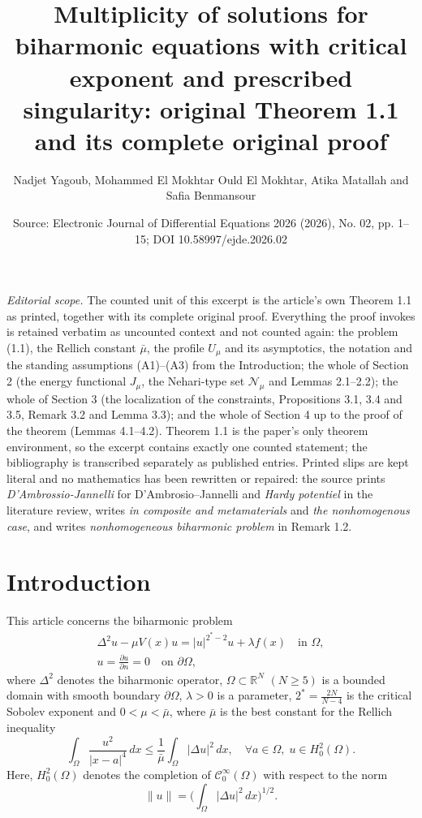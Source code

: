\documentclass[10pt,a4paper]{amsart}
\title[Singular critical biharmonic problem: original Theorem 1.1]{Multiplicity of solutions for biharmonic equations with critical exponent and prescribed singularity: original Theorem 1.1 and its complete original proof}
\author{Nadjet Yagoub, Mohammed El Mokhtar Ould El Mokhtar, Atika Matallah and Safia Benmansour}
\date{Source: Electronic Journal of Differential Equations 2026 (2026), No. 02, pp. 1--15; DOI 10.58997/ejde.2026.02}
\numberwithin{equation}{section}
\begin{document}
\maketitle
\noindent\textit{Editorial scope.} The counted unit of this excerpt is the article's own Theorem 1.1 as printed, together with its complete original proof. Everything the proof invokes is retained verbatim as uncounted context and not counted again: the problem (1.1), the Rellich constant $\bar\mu$, the profile $U_\mu$ and its asymptotics, the notation and the standing assumptions (A1)--(A3) from the Introduction; the whole of Section 2 (the energy functional $J_\mu$, the Nehari-type set $\mathcal{N}_\mu$ and Lemmas 2.1--2.2); the whole of Section 3 (the localization of the constraints, Propositions 3.1, 3.4 and 3.5, Remark 3.2 and Lemma 3.3); and the whole of Section 4 up to the proof of the theorem (Lemmas 4.1--4.2). Theorem 1.1 is the paper's only theorem environment, so the excerpt contains exactly one counted statement; the bibliography is transcribed separately as published entries. Printed slips are kept literal and no mathematics has been rewritten or repaired: the source prints \textit{D'Ambrossio-Jannelli} for D'Ambrosio--Jannelli and \textit{Hardy potentiel} in the literature review, writes \textit{in composite and metamaterials} and \textit{the nonhomogenous case}, and writes \textit{nonhomogeneous biharmonic problem} in Remark 1.2.
\section{Introduction}

This article concerns the biharmonic problem
\begin{equation}\label{11}
\begin{gathered}
 \Delta^2u-\mu V(x)u=|u|^{2^*-2}u+\lambda f(x)\quad \text{in }\Omega , \\
 u= \frac{\partial u}{\partial n}=0 \quad \text{on }\partial \Omega ,
 \end{gathered}
\end{equation}
where $\Delta^2$ denotes the biharmonic operator, $\Omega\subset\mathbb{R}^N$
$(N\ge5)$ is a bounded domain with smooth boundary $\partial\Omega$, $\lambda>0$
is a parameter, $2^*=\frac{2N}{N-4}$ is the critical Sobolev exponent and
 $0<\mu<\bar\mu$, where $\bar\mu$ is the best constant for the Rellich inequality
\[
\int_\Omega \frac{u^2}{|x-a|^4}\,dx \leq \frac{1}{\bar\mu}
\int_\Omega |\Delta u|^2\,dx,
\quad \forall a\in\Omega,\; u\in H^2_0(\Omega).
\]
Here, $H^2_0(\Omega)$ denotes the completion of $\mathcal{C}^\infty_0(\Omega)$ with
respect to the norm
\[
\|u\|=\Big(\int_\Omega |\Delta u|^2\,dx\Big)^{1/2}.
\]
\end{document}
